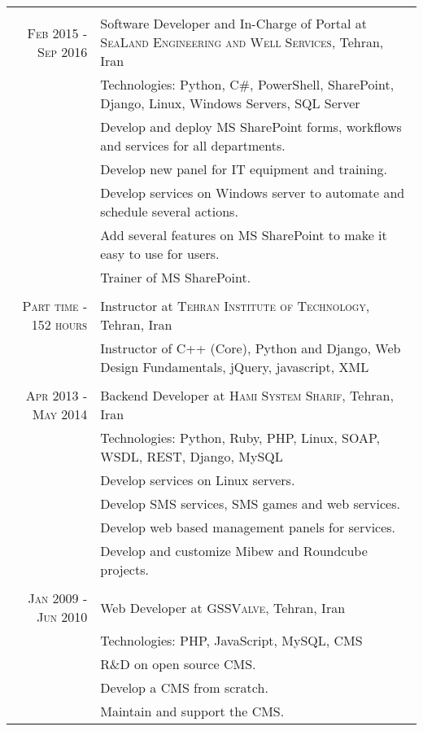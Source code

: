 \documentclass[a4paper,11pt]{article}
\begin{document}
\begin{tabular}{r|p{11cm}}
    \multicolumn{2}{c}{}\\
    \textsc{Feb 2015 - Sep 2016}
    & Software Developer and In-Charge of Portal at \textsc{SeaLand Engineering and Well Services},
    Tehran, Iran\\
    &\footnotesize{Technologies: Python, C\#, PowerShell, SharePoint, Django, Linux,  Windows Servers, SQL Server}\\
    &\footnotesize{Develop and deploy MS SharePoint forms, workflows and services for all departments.}\\
    &\footnotesize{Develop new panel for IT equipment and training.}\\
    &\footnotesize{Develop services on Windows server to automate and schedule several actions.}\\
    &\footnotesize{Add several features on MS SharePoint to make it easy to use for users.}\\
    &\footnotesize{Trainer of MS SharePoint.}\\

    \multicolumn{2}{c}{}\\
    \textsc{Part time - 152 hours}
    & Instructor at \textsc{Tehran Institute of Technology},
    Tehran, Iran\\
    &\footnotesize{Instructor of C++ (Core), Python and Django, Web Design Fundamentals, jQuery, javascript, XML}\\

    \multicolumn{2}{c}{}\\
    \textsc{Apr 2013 - May 2014}
    & Backend Developer at \textsc{Hami System Sharif},
    Tehran, Iran\\
    &\footnotesize{Technologies: Python, Ruby, PHP, Linux, SOAP, WSDL, REST, Django, MySQL}\\
    &\footnotesize{Develop services on Linux servers.}\\
    &\footnotesize{Develop SMS services, SMS games and web services.}\\
    &\footnotesize{Develop web based management panels for services.}\\
    &\footnotesize{Develop and customize Mibew and Roundcube projects.}\\

    \multicolumn{2}{c}{}\\
    \textsc{Jan 2009 - Jun 2010}
    & Web Developer at \textsc{GSSValve},
    Tehran, Iran\\
    &\footnotesize{Technologies: PHP, JavaScript, MySQL, CMS}\\
    &\footnotesize{R\&D on open source CMS.}\\
    &\footnotesize{Develop a CMS from scratch.}\\
    &\footnotesize{Maintain and support the CMS.}

\end{tabular}\\
\end{document}
